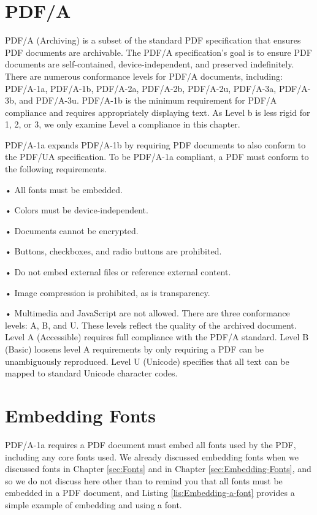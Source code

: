 \documentclass[american]{tufte-book}
\numberwithin{equation}{section}
\numberwithin{figure}{section}
\begin{document}
{{\section{PDF/A}

PDF/A (Archiving) is a subset of the standard PDF specification that
ensures PDF documents are archivable. The PDF/A specification's goal
is to ensure PDF documents are self-contained, device-independent,
and preserved indefinitely. There are numerous conformance levels
for PDF/A documents, including: PDF/A-1a, PDF/A-1b, PDF/A-2a, PDF/A-2b,
PDF/A-2u, PDF/A-3a, PDF/A-3b, and PDF/A-3u. PDF/A-1b is the minimum
requirement for PDF/A compliance and requires appropriately displaying
text. As Level b is less rigid for 1, 2, or 3, we only examine Level
a compliance in this chapter.

PDF/A-1a expands PDF/A-1b by requiring PDF documents to also conform
to the PDF/UA specification. To be PDF/A-1a compliant, a PDF must
conform to the following requirements. 

• All fonts must be embedded.

• Colors must be device-independent.

• Documents cannot be encrypted.

• Buttons, checkboxes, and radio buttons are prohibited.

• Do not embed external files or reference external content.

• Image compression is prohibited, as is transparency.

• Multimedia and JavaScript are not allowed.
There are three conformance levels: A, B, and U. These levels reflect
the quality of the archived document. Level A (Accessible) requires
full compliance with the PDF/A standard. Level B (Basic) loosens level
A requirements by only requiring a PDF can be unambiguously reproduced.
Level U (Unicode) specifies that all text can be mapped to standard
Unicode character codes.

\section{Embedding Fonts}

PDF/A-1a requires a PDF document must embed all fonts used by the
PDF, including any core fonts used. We already discussed embedding
fonts when we discussed fonts in Chapter \ref{sec:Fonts} and in Chapter
\ref{sec:Embedding-Fonts}, and so we do not discuss here other than
to remind you that all fonts must be embedded in a PDF document, and
Listing \ref{lis:Embedding-a-font} provides a simple example of embedding
and using a font.

}}
\end{document}
